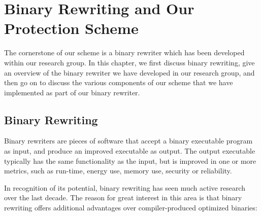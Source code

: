 
\renewcommand{\thechapter}{3}

\chapter{Binary Rewriting and Our Protection Scheme}

The cornerstone of our scheme is a binary rewriter which has been developed within our research
group. In this chapter, we first discuss binary rewriting, give an overview of the binary rewriter
we have developed in our research group, and then go on to discuss the various components of our
scheme that we have implemented as part of our binary rewriter.

\section{Binary Rewriting}

Binary rewriters are pieces of software that accept a binary executable program as input, and
produce an improved executable as output. The output executable typically has the same functionality
as the input, but is improved in one or more metrics, such as run-time, energy use, memory use,
security or reliability. 

In recognition of its potential, binary rewriting has seen much active research over the last
decade. The reason for great interest in this area is that binary rewriting offers additional
advantages over compiler-produced optimized binaries:

